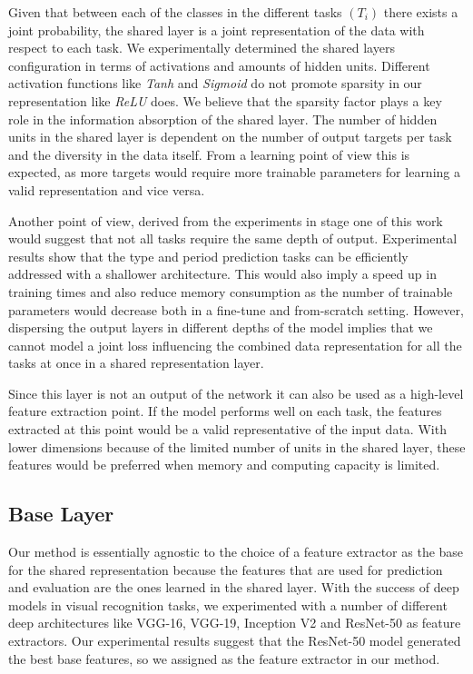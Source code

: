 \documentclass[sigconf]{acmart}
\begin{document}
Given that between each of the classes in the different tasks
\begin{math}
(T_{i})
\end{math}
there exists a joint probability, the shared layer is a joint representation of the data with respect to each task. We experimentally determined the shared layers configuration in terms of activations and amounts of hidden units. Different activation functions like \textit{Tanh}\cite{lecun2012efficient} and \textit{Sigmoid}\cite{lecun2012efficient} do not promote sparsity in our representation like \textit{ReLU}\cite{nair2010rectified} does. We believe that the sparsity factor plays a key role in the information absorption of the shared layer. The number of hidden units in the shared layer is dependent on the number of output targets per task and the diversity in the data itself. From a learning point of view this is expected, as more targets would require more trainable parameters for learning a valid representation and vice versa.

Another point of view, derived from the experiments in stage one of this work would suggest that not all tasks require the same depth of output. Experimental results show that the type and period prediction tasks can be efficiently addressed with a shallower architecture. This would also imply a speed up in training times and also reduce memory consumption as the number of trainable parameters would decrease both in a fine-tune and from-scratch setting. However, dispersing the output layers in different depths of the model implies that we cannot model a joint loss influencing the combined data representation for all the tasks at once in a shared representation layer. 

Since this layer is not an output of the network it can also be used as a high-level feature extraction point. If the model performs well on each task, the features extracted at this point would be a valid representative of the input data. With lower dimensions because of the limited number of units in the shared layer, these features would be preferred when memory and computing capacity is limited. 

\subsection{Base Layer}

Our method is essentially agnostic to the choice of a feature extractor as the base for the shared representation because the features that are used for prediction and evaluation are the ones learned in the shared layer. With the success of deep models in visual recognition tasks, we experimented with a number of different deep architectures like VGG-16, VGG-19, Inception V2 and ResNet-50 as feature extractors. Our experimental results suggest that the ResNet-50 model generated the best base features, so we assigned as the feature extractor in our method.
\end{document}
